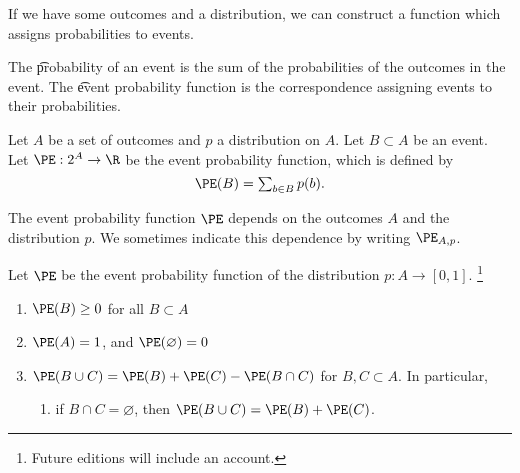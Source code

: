 

If we have some outcomes and a distribution, we can construct a function which assigns probabilities to events.


The \t{probability of an event} is the sum of the probabilities of the outcomes in the event.
The \t{event probability function} is the correspondence assigning events to their probabilities.


Let $A$ be a set of outcomes and $p$ a distribution on $A$.
Let $B \subset A$ be an event.
Let $\PE: 2^A \to \R $ be the event probability function, which is defined by
  \[
\textstyle
\PE(B) = \sum_{b \in B} p(b).
  \]

The event probability function $\PE$ depends on the outcomes $A$ and the distribution $p$.
We sometimes indicate this dependence by writing $\PE_{A, p}$.


\begin{proposition}
Let $\PE$ be the event probability function of the distribution $p: A \to [0, 1]$.
  \ifhmode\unskip\fi\footnote{
Future editions will include an account.
  }
  \begin{enumerate}
  \item $\PE(B) \geq 0$ for all $B \subset A$
  \item $\PE(A) = 1$, and $\PE(\varnothing) = 0$
  \item $\PE(B \cup C) = \PE(B) + \PE(C) - \PE(B \cap C)$ for $B, C \subset A$.
In particular,
          \begin{enumerate}
    \item if $B \cap C = \varnothing$, then $\PE(B \cup C) = \PE(B) + \PE(C)$.
          \end{enumerate}
  \end{enumerate}
\end{proposition}
